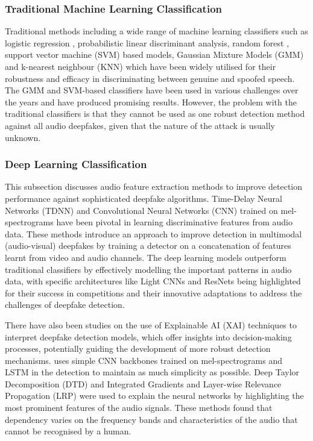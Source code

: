 \documentclass{Interspeech}
\begin{document}
\subsubsection{Traditional Machine Learning Classification}
Traditional methods including a wide range of machine learning classifiers such
as logistic regression \cite{10.1007/978-3-030-61702-8_1}, probabilistic linear
discriminant analysis, random forest \cite{ji2017ensemble}, support vector
machine (SVM) based models, Gaussian Mixture Models (GMM)\cite{ASVspoof_21} and
k-nearest neighbour (KNN) which have been widely utilised for their robustness
and efficacy in discriminating between genuine and spoofed speech. The GMM and
SVM-based classifiers have been used in various challenges over the years and
have produced promising results. However, the problem with the traditional
classifiers is that they cannot be used as one robust detection method against
all audio deepfakes, given that the nature of the attack is usually unknown.

\subsubsection{Deep Learning Classification}
This subsection discusses audio feature extraction methods to improve detection
performance against sophisticated deepfake algorithms. Time-Delay Neural
Networks (TDNN) \cite{multimodal_df_detection} and Convolutional Neural
Networks (CNN) \cite{xai_detection} trained on mel-spectrograms have been
pivotal in learning discriminative features from audio data. These methods
introduce an approach to improve detection in multimodal (audio-visual)
deepfakes by training a detector on a concatenation of features learnt from
video and audio channels. The deep learning models outperform traditional
classifiers by effectively modelling the important patterns in audio data, with
specific architectures like Light CNNs and ResNets being highlighted for their
success in competitions and their innovative adaptations to address the
challenges of deepfake detection.

There have also been studies on the use of Explainable AI (XAI) techniques to
interpret deepfake detection models, which offer insights into decision-making
processes, potentially guiding the development of more robust detection
mechanisms. \cite{xai_detection} uses simple CNN backbones trained on
mel-spectrograms and LSTM in the detection to maintain as much simplicity as
possible. Deep Taylor Decomposition (DTD) and Integrated Gradients and
Layer-wise Relevance Propagation (LRP) were used to explain the neural networks
by highlighting the most prominent features of the audio signals. These methods
found that dependency varies on the frequency bands and characteristics of the
audio that cannot be recognised by a human.
\end{document}
